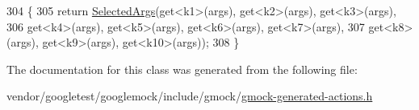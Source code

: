 \begin{DoxyCode}
304                                                         \{
305     \textcolor{keywordflow}{return} \hyperlink{classtesting_1_1internal_1_1SelectArgs_ad1eaa794653b3f4cefdb5c2285b418a7}{SelectedArgs}(get<k1>(args), get<k2>(args), get<k3>(args),
306         get<k4>(args), get<k5>(args), get<k6>(args), get<k7>(args),
307         get<k8>(args), get<k9>(args), get<k10>(args));
308   \}
\end{DoxyCode}


The documentation for this class was generated from the following file\+:\begin{DoxyCompactItemize}
\item 
vendor/googletest/googlemock/include/gmock/\hyperlink{gmock-generated-actions_8h}{gmock-\/generated-\/actions.\+h}\end{DoxyCompactItemize}
